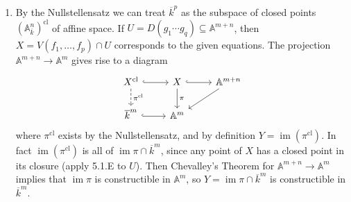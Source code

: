 \documentclass{report}
\newcommand{\closure}[1]{\overline{#1}} %
\newcommand{\cl}{{\mathrm{cl}}} %
\newcommand{\A}{\mathbb{A}}
\DeclareMathOperator{\im}{im}
\begin{document}
\begin{enumerate}[label=\textbf{7.4.\Alph*.}]
	\item By the Nullstellensatz we can treat $\closure{k}^p$ as the subspace
	      of closed points $(\A^n_{\closure k})^\cl$ of affine space. If
	      $U=D(g_1\cdots g_q)\subseteq\A^{m+n}$, then $X=V(f_1,\ldots,f_p)\cap U$
	      corresponds to the given equations. The projection $\A^{m+n}\to\A^m$
	      gives rise to a diagram
	      \begin{equation*}
		      \begin{tikzcd}
			      &X^\cl \ar[r,hook] \ar[d,dashed,"\pi^\cl"]
			      &X \ar[r,hook] \ar[d,"\pi"]
			      &\A^{m+n} \ar[dl] \\
			      &\closure{k}^m \ar[r,hook]
			      &\A^m & &
		      \end{tikzcd}
	      \end{equation*}
	      where $\pi^\cl$ exists by the Nullstellensatz, and by definition
	      $Y=\im(\pi^\cl)$. In fact $\im(\pi^\cl)$ is all of
	      $\im\pi\cap\closure{k}^m$, since any point of $X$ has a closed point
	      in its closure (apply 5.1.E to $U$). Then Chevalley's Theorem for
	      $\A^{m+n}\to\A^m$ implies that $\im\pi$ is constructible in $\A^m$, so
	      $Y=\im\pi\cap\closure{k}^m$ is constructible in $\closure{k}^m$.


\end{enumerate}
\end{document}
